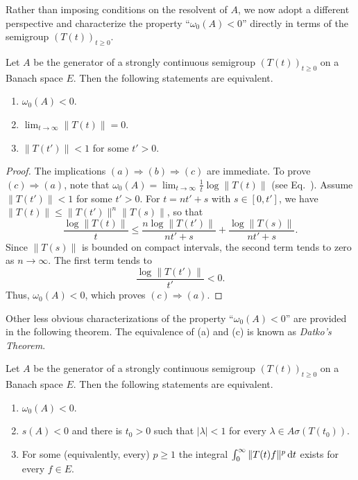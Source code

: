 Rather than imposing conditions on the resolvent of\/ $ A $, we now adopt a different perspective and characterize the property \enquote{$ \omega_{0}(A) < 0 $} directly in terms of the semigroup $ (T(t))_{t \geq 0} $.
\begin{proposition} \label{prop:a4-1.10} 
Let $ A $ be the generator of a strongly continuous semigroup $ (T(t))_{t \geq 0} $ on a Banach space $E$. 
Then the following statements are equivalent.
\begin{enumerate}[\upshape (a)]
\item  
$ \omega_{0}(A) < 0 $.
\item  
$ \lim_{t \to \infty} \| T(t) \| = 0 $.
\item  
$ \| T(t') \| < 1 $ for some $ t' > 0 $.
\end{enumerate}
\end{proposition}
\begin{proof}
The implications $(a)  \Rightarrow  (b)  \Rightarrow  (c) $ are immediate. To prove $(c)  \Rightarrow  (a) $, note that $\omega_{0}(A) = \lim_{t \to \infty} \frac{1}{t} \log \| T(t) \|$ (see Eq.~). Assume $\|T(t')\| <1$ for some $t'>0$. For $t=nt'+s$ with $s\in [0,t']$, we have $\|T(t)\| \leq \|T(t')\|^n\|T(s)\|$, so that
\[
\displaystyle
\frac{\log \|T(t)\|}{t} \leq \frac{n\log \|T(t')\|}{nt'+s} + \frac{\log \|T(s)\|}{nt' + s}.
\]
Since $\|T(s)\|$ is bounded on compact intervals, the second term tends to zero as $n\to\infty$. The first term tends to 
%
\[
	\frac{\log \|T(t')\|}{t'} < 0 .
\]
%
Thus, $\omega_0(A) < 0$, which proves  $(c)  \Rightarrow  (a) $.
\end{proof}
Other less obvious characterizations of the property 
\enquote{$ \omega_{0}(A) < 0 $} are provided in the following theorem. 
The equivalence of (a) and (c) is known as \emph{Datko’s Theorem}.
\begin{theorem} \label{thm:a4-1.11} 
Let $ A $ be the generator of a strongly continuous semigroup $ (T(t))_{t \geq 0} $ on a Banach space $ E $. 
Then the following statements are equivalent.
\begin{enumerate}[\upshape (a)]
\item
$ \omega_{0}(A) < 0 $.
\item
$ s(A) < 0 $ and there is $ t_0 > 0 $ such that  
$ |\lambda| < 1$ for every $ \lambda \in A\sigma (T(t_0)).$
\item
For some (equivalently, every) $ p \geq 1 $ the integral $ \int_{0}^{\infty} \| T(t) f \|^p\mathop{}\!\mathrm{d}{t} $ exists for every $ f \in E $.
\end{enumerate}
\end{theorem}

